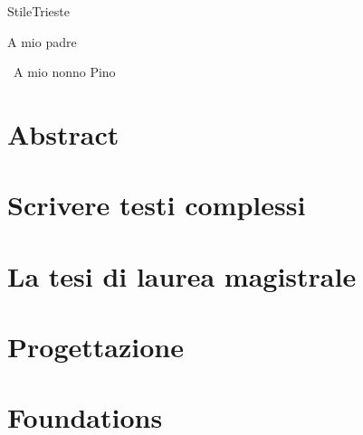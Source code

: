 \documentclass[cucitura%
]{toptesi}
\begin{document}

%

\setcounter{page}{1}


\expandafter\ifx\csname StileTrieste\endcsname\relax
    \frontespizio
\else
    \paginavuota
    \begin{dedica}
        A mio padre

        \textdagger\ A mio nonno Pino
    \end{dedica}
    \tomo
\fi

\newpage
\thispagestyle{empty}
\mbox{}


\setcounter{page}{1}

\chapter*{Abstract}


\ringraziamenti



\tableofcontents
\listoffigures
\listoftables

\printglossary[type=\acronymtype]


\mainmatter

\setcounter{page}{1}

\chapter{Scrivere testi complessi}


\chapter{La tesi di laurea magistrale}


\chapter{Progettazione}


\chapter{Foundations}


\printbibliography[
heading=bibintoc,
]
\end{document}
